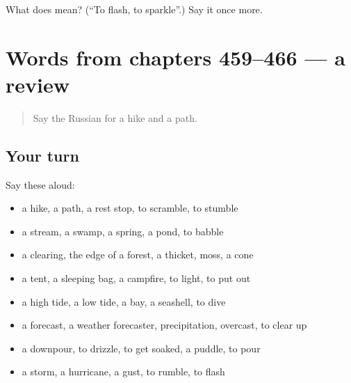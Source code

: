 \begin{tcolorbox}[breakable,colback=teal!4,colframe=teal!35!black,title={Before you move on}]
What does  mean? (\textquotedblleft{}To flash, to sparkle\textquotedblright{}.) Say it once more.
\end{tcolorbox}
\section[(dialogue)]{Words from chapters 459–466 — a review}

\label{lesson:RU-R466-review-459-466}



\begin{quote}
Say the Russian for a hike and a path.
\end{quote}

\subsection*{Your turn}
Say these aloud:

\begin{itemize}
\raggedright
  \item a hike, a path, a rest stop, to scramble, to stumble
  \item a stream, a swamp, a spring, a pond, to babble
  \item a clearing, the edge of a forest, a thicket, moss, a cone
  \item a tent, a sleeping bag, a campfire, to light, to put out
  \item a high tide, a low tide, a bay, a seashell, to dive
  \item a forecast, a weather forecaster, precipitation, overcast, to clear up
  \item a downpour, to drizzle, to get soaked, a puddle, to pour
  \item a storm, a hurricane, a gust, to rumble, to flash
\end{itemize}

